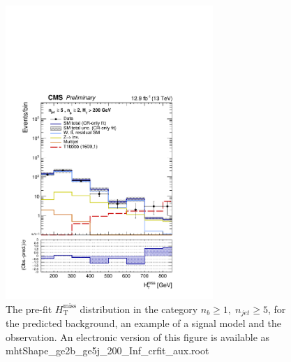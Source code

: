 \clearpage
\begin{figure}[tbhp]
    \caption{ 
    The pre-fit $H_{\mathrm{T}}^{\mathrm{miss}}$ distribution in the category $n_{b}\geq 1, \; n_{jet} \geq 5$, 
    for the predicted background, an example of a signal model and the observation.
    An electronic version of this figure is available as mhtShape\_ge2b\_ge5j\_200\_Inf\_crfit\_aux.root
    \label{fig:mhtShape_ge2b_ge5j_crfit} }
  \begin{center}
  \includegraphics[width=0.7\textwidth]{mhtShape_ge2b_ge5j_200_Inf_crfit_aux}
  \end{center}
\end{figure}


